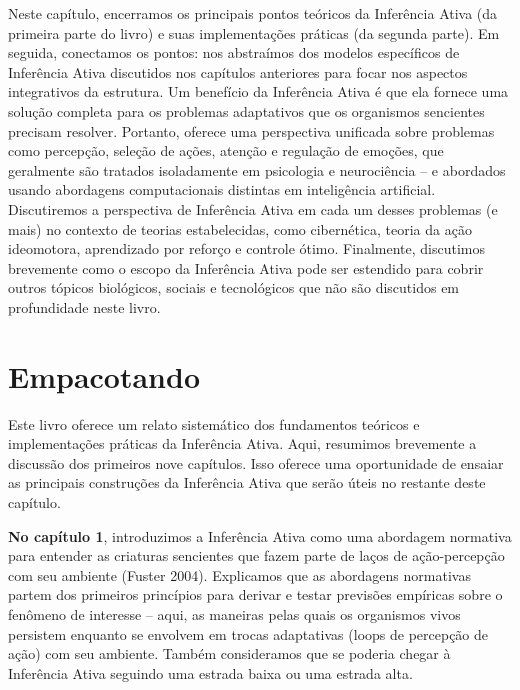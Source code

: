 \documentclass[
  12pt,
]{book}
\begin{document}
Neste capítulo, encerramos os principais pontos teóricos da Inferência Ativa (da primeira parte do livro) e suas implementações práticas (da segunda parte). Em seguida, conectamos os pontos: nos abstraímos dos modelos específicos de Inferência Ativa discutidos nos capítulos anteriores para focar nos aspectos integrativos da estrutura. Um benefício da Inferência Ativa é que ela fornece uma solução completa para os problemas adaptativos que os organismos sencientes precisam resolver. Portanto, oferece uma perspectiva unificada sobre problemas como percepção, seleção de ações, atenção e regulação de emoções, que geralmente são tratados isoladamente em psicologia e neurociência -- e abordados usando abordagens computacionais distintas em inteligência artificial. Discutiremos a perspectiva de Inferência Ativa em cada um desses problemas (e mais) no contexto de teorias estabelecidas, como cibernética, teoria da ação ideomotora, aprendizado por reforço e controle ótimo. Finalmente, discutimos brevemente como o escopo da Inferência Ativa pode ser estendido para cobrir outros tópicos biológicos, sociais e tecnológicos que não são discutidos em profundidade neste livro.

\hypertarget{empacotando}{%
\section{Empacotando}\label{empacotando}}

Este livro oferece um relato sistemático dos fundamentos teóricos e implementações práticas da Inferência Ativa. Aqui, resumimos brevemente a discussão dos primeiros nove capítulos. Isso oferece uma oportunidade de ensaiar as principais construções da Inferência Ativa que serão úteis no restante deste capítulo.

\textbf{No capítulo 1}, introduzimos a Inferência Ativa como uma abordagem normativa para entender as criaturas sencientes que fazem parte de laços de ação-percepção com seu ambiente (Fuster 2004). Explicamos que as abordagens normativas partem dos primeiros princípios para derivar e testar previsões empíricas sobre o fenômeno de interesse -- aqui, as maneiras pelas quais os organismos vivos persistem enquanto se envolvem em trocas adaptativas (loops de percepção de ação) com seu ambiente. Também consideramos que se poderia chegar à Inferência Ativa seguindo uma estrada baixa ou uma estrada alta.
\end{document}
